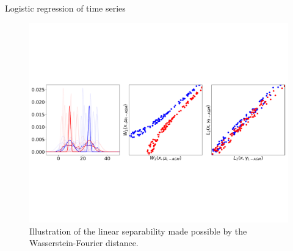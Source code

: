 \documentclass[pdf,aspectratio=169,10pt]{beamer}
\begin{document}
\begin{frame}{Logistic regression of time series}
\begin{figure}
\includegraphics[trim={0 180 0 180},clip,width=1\textwidth]{../img/toy_example2.pdf}
{Illustration of the linear separability made possible by the Wasserstein-Fourier distance.}
\end{figure}
\end{frame} 
\end{document}

